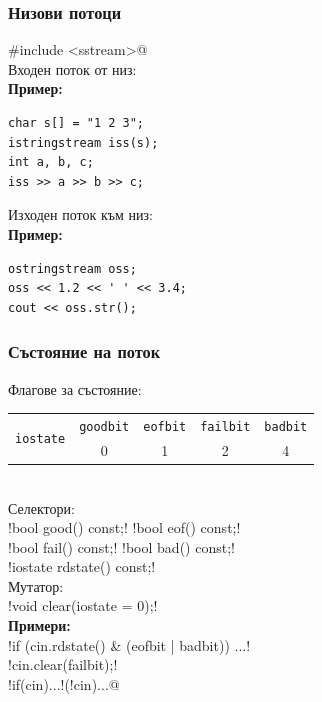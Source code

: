 \documentclass{beamer}
\begin{document}
\begin{frame}[fragile]
  \frametitle{Низови потоци}

  \lst@#include <sstream>@\\[1em]
  Входен поток от низ: \\[1em]
  \textbf{Пример:}
\begin{lstlisting}
char s[] = "1 2 3";
istringstream iss(s);
int a, b, c;
iss >> a >> b >> c;
\end{lstlisting}
  \vspace{1em}
  \pause
  Изходен поток към низ: \\[1em]
  \textbf{Пример:}
\begin{lstlisting}
ostringstream oss;
oss << 1.2 << ' ' << 3.4;
cout << oss.str();
\end{lstlisting}
\end{frame}

\begin{frame}[fragile]
  \frametitle{Състояние на поток}

  Флагове за състояние:\\[1em]
  \begin{tabular}{|c||c|c|c|c|}
    \hline
    \multirow{2}{*}{\tt{iostate}}&\tt{goodbit}&\tt{eofbit}&\tt{failbit}&\tt{badbit}\\
    \cline{2-5}
    &0&1&2&4\\
    \hline
  \end{tabular}\\[1em]
  \pause
  Селектори:\\
  \lst!bool good() const;!
  \lst!bool eof() const;!\\
  \lst!bool fail() const;!
  \lst!bool bad() const;!\\
  \lst!iostate rdstate() const;!\\[1em]
  Мутатор:\\
  \lst!void clear(iostate = 0);!\\[1em]
  \textbf{Примери:}\\
  \lst!if (cin.rdstate() & (eofbit | badbit)) ...!\\
  \lst!cin.clear(failbit);!\\
  \lst!if(cin)...!\hspace{10ex}\lst@if(!cin)...@
\end{frame}
\end{document}
